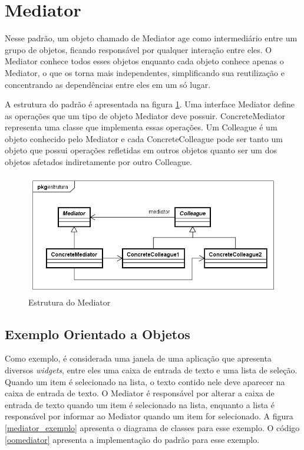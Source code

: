\section{Mediator}


Nesse padrão, um objeto chamado de Mediator age como intermediário 
entre um grupo de objetos, ficando responsável por qualquer 
interação entre eles. O Mediator conhece todos 
esses objetos enquanto cada objeto conhece apenas o 
Mediator, o que os torna 
mais independentes, simplificando sua reutilização
 e concentrando as dependências entre eles 
em um só lugar. \cite{gamma:1995}

A estrutura do padrão é apresentada na figura \ref{mediator_struct}. 
Uma interface Mediator define as operações que um tipo de 
objeto Mediator deve possuir. ConcreteMediator representa 
uma classe que implementa essas operações. Um Colleague 
é um objeto conhecido pelo Mediator e cada ConcreteColleague 
pode ser tanto um objeto que possui operações refletidas 
em outros objetos quanto ser um dos objetos afetados 
indiretamente por outro Colleague.

\begin{figure}[htb]
	\caption{\label{mediator_struct}Estrutura do Mediator}
	\begin{center}
	    \includegraphics[scale=0.5]{5_padroes-contexto-funcional/5.3_comportamentais/5.3.05_mediator/mediator_estrutura.png}
	\end{center}
\end{figure}

\subsection*{Exemplo Orientado a Objetos}

Como exemplo, é considerada uma janela de uma aplicação 
que apresenta diversos \textit{widgets}, entre eles uma caixa 
de entrada de texto e uma lista de seleção. Quando um item é 
selecionado na lista, o texto contido nele deve aparecer 
na caixa de entrada de texto. O Mediator é responsável 
por alterar a caixa de entrada de texto quando um item 
é selecionado na lista, enquanto a lista é responsável 
por informar ao Mediator quando um item for selecionado. 
A figura \ref{mediator_exemplo} apresenta o diagrama 
de classes para esse exemplo. O código \ref{oomediator} 
apresenta a implementação do padrão para esse exemplo.

